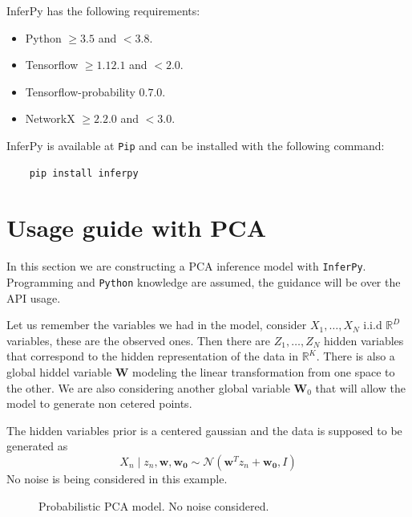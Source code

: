 InferPy has the following requirements:
\begin{itemize}
    \item Python \( \geq 3.5 \) and \( < 3.8 \).  
    \item Tensorflow \(\geq  1.12.1 \) and \( < 2.0 \).
    \item Tensorflow-probability \( 0.7.0 \).
    \item NetworkX \( \geq 2.2.0 \) and \( < 3.0 \).   
\end{itemize}

InferPy is available at \texttt{Pip} and can be installed with the following command:

\begin{verbatim}
    pip install inferpy
\end{verbatim}

\section{Usage guide with PCA}

In this section we are constructing a PCA inference model with \texttt{InferPy}. Programming and \texttt{Python} knowledge are assumed, the guidance will be over the API usage.

Let us remember the variables we had in the model, consider \( X_1, \dots, X_N \) i.i.d \( \mathbb{R}^D \) variables, these are the observed ones. Then there are \( Z_1,\dots,Z_N \) hidden variables that correspond to the hidden representation of the data in \( \mathbb{R}^K \). There is also a global hiddel variable \( \bm{W} \) modeling the linear transformation from one space to the other. We are also considering another global variable \( \bm{W}_0 \) that will allow the model to generate non cetered points. 

The hidden variables prior is a centered gaussian and the data is supposed to be generated as
\[
     X_n \mid z_n, \bm{w}, \bm{w_0} \sim \mathcal{N}(\bm{w}^T z_n + \bm{w_0}, I)
\]
No noise is being considered in this example.

\begin{figure}[h!]
    \centering
    \caption{Probabilistic PCA model. No noise considered.}
  \end{figure}
  
